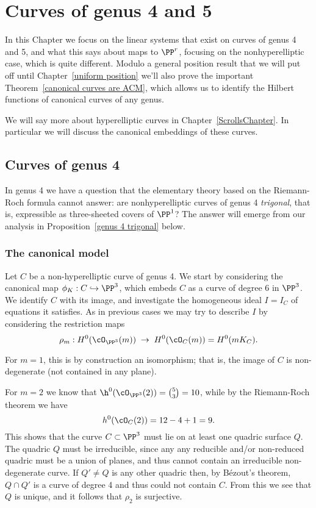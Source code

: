 

\chapter{Curves of genus 4 and 5}\label{genus 4, 5 Chapter}

In this Chapter we focus on the linear systems that exist on curves of genus 4 and 5, and what this says about maps to $\PP^r$, focusing on the nonhyperelliptic case, which is quite different. Modulo a general position result that we will put off until Chapter~\ref{uniform position} we'll also prove the
important Theorem~\ref{canonical curves are ACM}, which allows us to identify the Hilbert functions of canonical curves of any genus.

We will say more about hyperelliptic curves in Chapter~\ref{ScrollsChapter}. 
In particular we will discuss the canonical embeddings of these curves. 
\section{Curves of genus 4}

In genus 4 we have a question that the elementary theory based on the Riemann-Roch formula cannot answer: are nonhyperelliptic curves of genus 4 \emph{trigonal}, that is, expressible as three-sheeted covers of $\PP^1$? The answer will emerge from our analysis in Proposition~\ref{genus 4 trigonal} below.

\subsection{The canonical model}\label{canonical genus 4}

Let $C$ be a non-hyperelliptic curve of genus 4. We start by considering the canonical map $\phi_K : C \hookrightarrow \PP^3$, which embeds $C$ as a curve of degree 6 in $\PP^3$. We identify $C$ with its image, and investigate the homogeneous ideal $I = I_C$ of equations it satisfies. As in previous cases we may try to describe $I$ by considering the restriction maps
$$
\rho_m : H^0(\cO_{\PP^3}(m)) \; \to \; H^0(\cO_{C}(m)) = H^0(mK_C).
$$

For $m=1$, this is by construction an isomorphism; that is, the image of $C$ is non-degenerate (not contained in any plane).

For $m=2$ we know that $\h^0(\cO_{\PP^3}(2)) = \binom{5}{3} = 10$, while by the Riemann-Roch
theorem we have
$$
h^0(\cO_C(2)) = 12 - 4 + 1 = 9.
$$
This shows that the curve $C \subset \PP^3$ must lie on at least one quadric surface $Q$. The quadric $Q$ must be irreducible, since any any reducible and/or non-reduced quadric must be a union of planes, and thus cannot contain an irreducible non-degenerate curve.
If $Q'\neq Q$ is any other quadric then, by B\'ezout's theorem, $Q\cap Q'$ is a curve of degree 4 and thus could not contain $C$. From this we see that $Q$ is unique, and it follows that $\rho_2$ is surjective.

